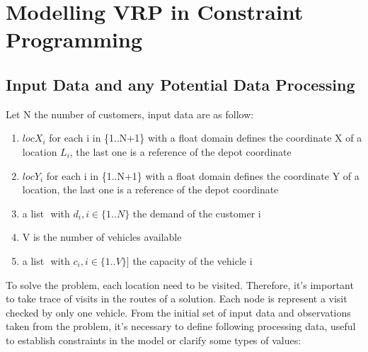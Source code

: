 \chapter{Modelling VRP in Constraint Programming}
\section{Input Data and any Potential Data Processing}
Let N the number of customers, input data are as follow:
\begin{enumerate}
    \item \begin{math}locX_{i}\end{math} for each i in \{1..N+1\} with a float domain defines the coordinate X of a location \begin{math}L_{i}\end{math}, the last one is a reference of the depot coordinate 
    \item \begin{math}locY_{i}\end{math} for each i in \{1..N+1\} with a float domain defines the coordinate Y of a location, the last one is a reference of the depot coordinate
    \item a list \begin{math}[de_{1}, ..., de_{N}]\end{math} with \begin{math}d_{i}, i \in \{1..N\}\end{math} the demand of the customer i
    \item V is the number of vehicles available
    \item a list \begin{math}[c_{1},..., c_{V}]\end{math} with \begin{math} c_{i}, i \in \{1..V\}]\end{math} the capacity of the vehicle i
\end{enumerate}
To solve the problem, each location need to be visited. Therefore, it's important to take trace of visits in the routes of a solution. Each node is represent a visit checked by only one vehicle. 
From the initial set of input data and observations taken from the problem, it's necessary to define following processing data, useful to establish constraints in the model or clarify some types of values:
